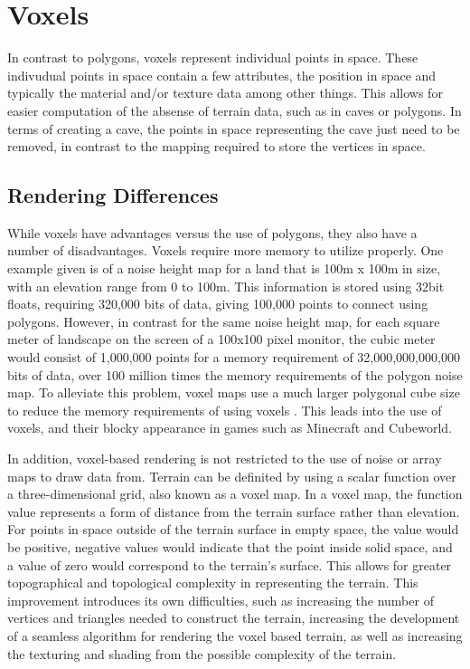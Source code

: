 \documentclass[10pt]{report}
\begin{document}
	
	\vspace{10pt}
	\let\clearpage\relax
	\chapter{Voxels}
	
		In contrast to polygons, voxels represent individual points in space. These indivudual points in space contain a few attributes, the position in space and typically the material and/or texture data among other things. This allows for easier computation of the absense of terrain data, such as in caves or polygons. In terms of creating a cave, the points in space representing the cave just need to be removed, in contrast to the mapping required to store the vertices in space. 
		
		\section{Rendering Differences}
		While voxels have advantages versus the use of polygons, they also have a number of disadvantages. Voxels require more memory to utilize properly. One example given is of a noise height map for a land that is 100m x 100m in size, with an elevation range from 0 to 100m. This information is stored using 32bit floats, requiring 320,000 bits of data, giving 100,000 points to connect using polygons. However, in contrast for the same noise height map, for each square meter of landscape on the screen of a 100x100 pixel monitor, the cubic meter would consist of 1,000,000 points for a memory requirement of 32,000,000,000,000 bits of data, over 100 million times the memory requirements of the polygon noise map. To alleviate this problem, voxel maps use a much larger polygonal cube size to reduce the memory requirements of using voxels \cite{high-level-voxel}. This leads into the use of voxels, and their blocky appearance in games such as Minecraft and Cubeworld.
		
		In addition, voxel-based rendering is not restricted to the use of noise or array maps to draw data from. Terrain can be definited by using a scalar function over a three-dimensional grid, also known as a voxel map. In a voxel map, the function value represents a form of distance from the terrain surface rather than elevation. For points in space outside of the terrain surface in empty space, the value would be positive, negative values would indicate that the point inside solid space, and a value of zero would correspond to the terrain's surface. This allows for greater topographical and topological complexity in representing the terrain. This improvement introduces its own difficulties, such as increasing the number of vertices and triangles needed to construct the terrain, increasing the development of a seamless algorithm for rendering the voxel based terrain, as well as increasing the texturing and shading from the possible complexity of the terrain. 
		
\end{document}
